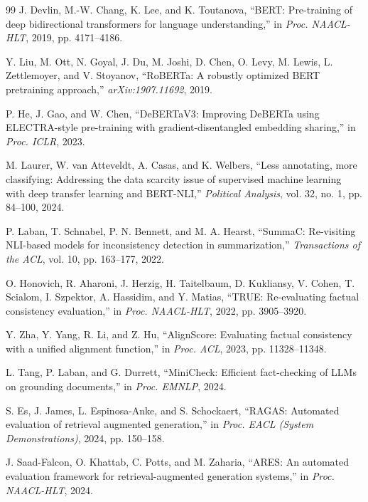 \documentclass[twocolumn]{ICCKjournal}
\begin{document}
\begin{fullwidth}
\begin{thebibliography}{99}
J. Devlin, M.-W. Chang, K. Lee, and K. Toutanova, ``BERT: Pre-training of deep bidirectional transformers for language understanding,'' in \textit{Proc. NAACL-HLT}, 2019, pp. 4171--4186.

Y. Liu, M. Ott, N. Goyal, J. Du, M. Joshi, D. Chen, O. Levy, M. Lewis, L. Zettlemoyer, and V. Stoyanov, ``RoBERTa: A robustly optimized BERT pretraining approach,'' \textit{arXiv:1907.11692}, 2019.

P. He, J. Gao, and W. Chen, ``DeBERTaV3: Improving DeBERTa using ELECTRA-style pre-training with gradient-disentangled embedding sharing,'' in \textit{Proc. ICLR}, 2023.

M. Laurer, W. van Atteveldt, A. Casas, and K. Welbers, ``Less annotating, more classifying: Addressing the data scarcity issue of supervised machine learning with deep transfer learning and BERT-NLI,'' \textit{Political Analysis}, vol. 32, no. 1, pp. 84--100, 2024.

P. Laban, T. Schnabel, P. N. Bennett, and M. A. Hearst, ``SummaC: Re-visiting NLI-based models for inconsistency detection in summarization,'' \textit{Transactions of the ACL}, vol. 10, pp. 163--177, 2022.

O. Honovich, R. Aharoni, J. Herzig, H. Taitelbaum, D. Kukliansy, V. Cohen, T. Scialom, I. Szpektor, A. Hassidim, and Y. Matias, ``TRUE: Re-evaluating factual consistency evaluation,'' in \textit{Proc. NAACL-HLT}, 2022, pp. 3905--3920.

Y. Zha, Y. Yang, R. Li, and Z. Hu, ``AlignScore: Evaluating factual consistency with a unified alignment function,'' in \textit{Proc. ACL}, 2023, pp. 11328--11348.

L. Tang, P. Laban, and G. Durrett, ``MiniCheck: Efficient fact-checking of LLMs on grounding documents,'' in \textit{Proc. EMNLP}, 2024.

S. Es, J. James, L. Espinosa-Anke, and S. Schockaert, ``RAGAS: Automated evaluation of retrieval augmented generation,'' in \textit{Proc. EACL (System Demonstrations)}, 2024, pp. 150--158.

J. Saad-Falcon, O. Khattab, C. Potts, and M. Zaharia, ``ARES: An automated evaluation framework for retrieval-augmented generation systems,'' in \textit{Proc. NAACL-HLT}, 2024.


\end{thebibliography}
\end{fullwidth}
\end{document}
